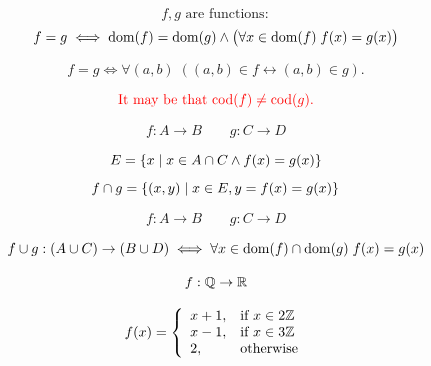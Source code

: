 
\begin{frame}{}
  \begin{center}
  \end{center}
\end{frame}

\begin{frame}{}
  \begin{theorem}
    \[
      f, g \text{ are functions}:
    \]
    \[
      f = g \iff \text{\textup{dom}}(f) = \text{\textup{dom}}(g)
        \land \big(\forall x \in \text{\textup{dom}}(f)\; f(x) = g(x) \big)
    \]
  \end{theorem}

  \pause
  \[
    f = g \iff \forall (a, b)\; ((a, b) \in f \leftrightarrow (a, b) \in g).
  \]

  \pause
  \[
    \textcolor{red}{\text{It may be that } \text{\textup{cod}}(f) \neq \text{\textup{cod}}(g).}
  \]
\end{frame}

\begin{frame}{}
  \[
    f: A \to B \qquad g: C \to D
  \]

  \begin{center}
  \end{center}

  \pause
  \begin{theorem}
    \[
      E = \{x \mid x \in A \cap C \land f(x) = g(x)\}
    \]
    \[
      f \cap g = \{(x, y) \mid x \in E, y = f(x) = g(x)\}
    \]
  \end{theorem}
\end{frame}

\begin{frame}{}
  \[
    f: A \to B \qquad g: C \to D
  \]

  \begin{center}
  \end{center}

  \pause
  \begin{theorem}
    {\[
      f \cup g: (A \cup C) \to (B \cup D) \iff
      \forall x \in \text{\textup{dom}}(f) \cap \text{\textup{dom}}(g)\; f(x) = g(x)
    \]}
  \end{theorem}

  \pause
  \begin{exampleblock}{}
    \[
      f: \mathbb{Q} \to \mathbb{R}
    \]

    \[
      f(x) = \left\{\begin{array}{ll}
        x + 1, & \text{if } x \in 2\mathbb{Z}{} \\
        x - 1, & \text{if } x \in 3\mathbb{Z}{} \\
        2,     & \text{otherwise}
      \end{array}\right.
    \]
  \end{exampleblock}
\end{frame}


